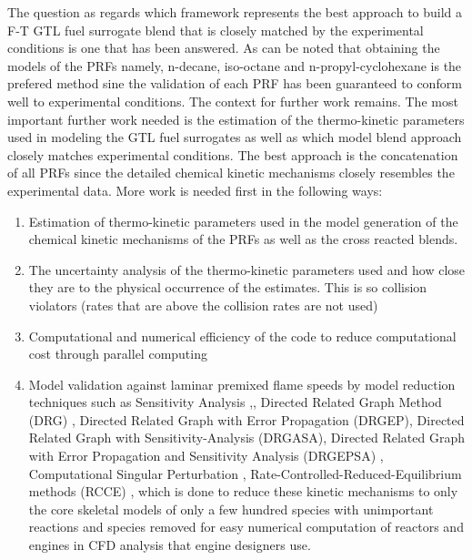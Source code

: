 The question as regards which framework represents the best approach to build a F-T GTL fuel surrogate blend that is closely matched by the experimental conditions is one that has been answered. As can be noted that obtaining the models of the PRFs namely, n-decane, iso-octane and n-propyl-cyclohexane is the prefered method sine the validation of each PRF has been guaranteed to conform well to experimental conditions. The context for further work remains. The most important further work needed is the estimation of the thermo-kinetic parameters used in modeling the GTL fuel surrogates as well as which model blend approach closely matches experimental conditions. The best approach is the concatenation of all PRFs since the detailed chemical kinetic mechanisms closely resembles the experimental data. More work is needed first in the following ways:
\begin{enumerate}
\begin{enumerate}
    \item Estimation of thermo-kinetic parameters used in the model generation of the chemical kinetic mechanisms of the PRFs as well as the cross reacted blends.
    \item The uncertainty analysis of the thermo-kinetic parameters used and how close they are to the physical occurrence of the estimates. This is so collision violators (rates that are above the collision rates are not used)
    \item Computational and numerical efficiency of the code to reduce computational cost through parallel computing
    \item Model validation against laminar premixed flame speeds by model reduction techniques such as Sensitivity Analysis \cite{Rabitz1983SensitivityKinetics},\cite{Turanyi1990SensitivityApplications}, Directed Related Graph Method (DRG) \cite{Lu2005AReduction}, Directed Related Graph with Error Propagation (DRGEP)\cite{Pepiot-Desjardins2008AnMechanisms}, Directed Related Graph with Sensitivity-Analysis (DRGASA)\cite{Sankaran2007StructureFlame}\cite{Zheng2007Experimental13-butadiene}, Directed Related Graph with Error Propagation and Sensitivity Analysis (DRGEPSA) \cite{Niemeyer2010SkeletalAnalysis}, Computational Singular Perturbation \cite{Massias1999AnData}, Rate-Controlled-Reduced-Equilibrium methods (RCCE) \cite{Keck1971Rate-controlledMixtures}, which is done to reduce these kinetic mechanisms to only the core skeletal models of only a few hundred species with unimportant reactions and species removed for easy numerical computation of reactors and engines in CFD analysis that engine designers use.
\end{enumerate}
\end{enumerate}

